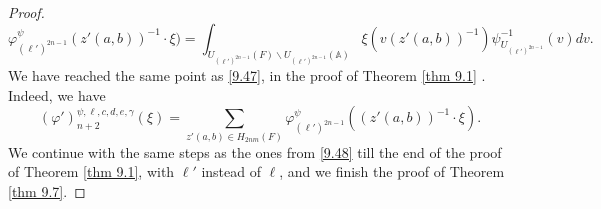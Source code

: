 \documentclass[12pts]{amsart}
\newcommand{\BA}{{\mathbb {A}}}
\begin{document}
\begin{proof}
\begin{equation}\label{9.89}
\varphi_{(\ell')^{2n-1}}^\psi(z'(a,b))^{-1}\cdot \xi)=\int_{U_{(\ell')^{2n-1}}(F)\backslash U_{(\ell')^{2n-1}}(\BA)}\xi(v(z'(a,b))^{-1})\psi^{-1}_{U_{(\ell')^{2n-1}}}(v)dv.
\end{equation}
We have reached the same point as \eqref{9.47}, in the proof of Theorem \ref{thm 9.1} . Indeed, we have
\begin{equation}\label{9.90} 
(\varphi')_{n+2}^{\psi,\ell,c,d,e,\gamma}(\xi)=\sum_{ z'(a,b)\in H_{2nm}(F)}\varphi_{(\ell')^{2n-1}}^\psi((z'(a,b))^{-1}\cdot\xi).
\end{equation}
We continue with the same steps as the ones from \eqref{9.48} till the end of the proof of Theorem \ref{thm 9.1}, with $\ell'$ instead of $\ell$, and we finish the proof of Theorem \ref{thm 9.7}.
\end{proof}
\end{document}
